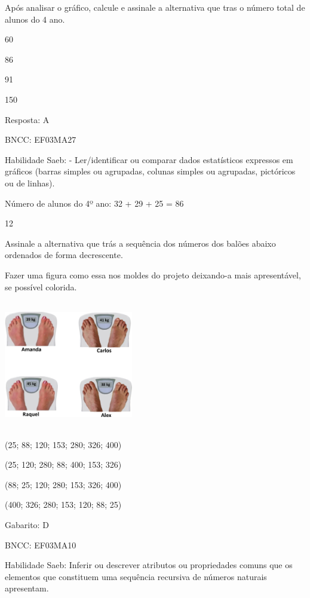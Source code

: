 \begin{escolha}
{\begin{escolha}
{Após analisar o gráfico, calcule e assinale a alternativa que tras o
número total de alunos do 4 ano.

\begin{escolha}
\item
  60
\item
  86
\item
  91
\item
  150
\end{escolha}

Resposta: A

BNCC: EF03MA27

Habilidade Saeb: - Ler/identificar ou comparar dados estatísticos
expressos em gráficos (barras simples ou agrupadas, colunas simples ou
agrupadas, pictóricos ou de linhas).

Número de alunos do 4º ano: 32 + 29 + 25 = 86

\num{12}

Assinale a alternativa que trás a sequência dos números dos balões
abaixo ordenados de forma decrescente.

Fazer uma figura como essa nos moldes do projeto deixando-a mais
apresentável, se possível colorida.

\includegraphics[width=2.21686in,height=2.20852in]{media/image113.png}

\begin{escolha}
\item
  (25; 88; 120; 153; 280; 326; 400)
\item
  (25; 120; 280; 88; 400; 153; 326)
\item
  (88; 25; 120; 280; 153; 326; 400)
\item
  (400; 326; 280; 153; 120; 88; 25)
\end{escolha}

Gabarito: D

BNCC: EF03MA10

Habilidade Saeb: Inferir ou descrever atributos ou propriedades comuns
que os elementos que constituem uma sequência recursiva de números
naturais apresentam.

}
\end{escolha}}
\end{escolha}
